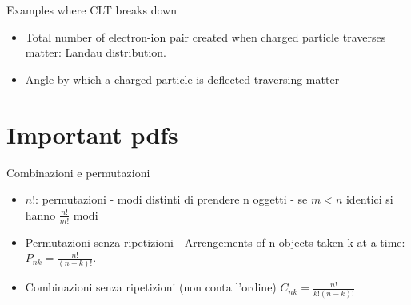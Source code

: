\documentclass[asd-beamer.tex]{subfiles}
\begin{document}
\begin{frame}{Examples where CLT breaks down}
\begin{itemize}
\item Total number of electron-ion pair created when charged particle traverses matter: Landau distribution.
\item Angle by which a charged particle is deflected traversing matter
\end{itemize}
\end{frame}

\section{Important pdfs}

\begin{wordonframe}{Combinazioni e permutazioni}
\begin{itemize}
\item $n!$: permutazioni - modi distinti di prendere n oggetti - se $m<n$ identici si hanno $\frac{n!}{m!}$ modi
\item Permutazioni senza ripetizioni - Arrengements of n objects taken k at a time: $P_{nk}=\frac{n!}{(n-k)!}$.
\item Combinazioni senza ripetizioni (non conta l'ordine) $C_{nk}=\frac{n!}{k!(n-k)!}$
\end{itemize}
\end{wordonframe}
\end{document}
